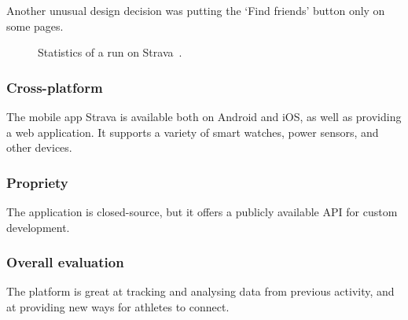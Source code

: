Another unusual design decision was putting the `Find friends' button only on some pages.

\begin{figure}[h]
    \centering
    \caption{Statistics of a run on Strava~\cite{strava-run-stats-img}.}
    \label{strava-run-stats-img}
\end{figure}

\subsubsection*{Cross-platform}
The mobile app Strava is available both on Android and iOS, as well as providing a web application.
It supports a variety of smart watches, power sensors, and other devices.
\subsubsection*{Propriety}
The application is closed-source, but it offers a publicly available API for custom development.
\subsubsection*{Overall evaluation}
The platform is great at tracking and analysing data from previous activity, and at providing new ways for athletes to connect.
